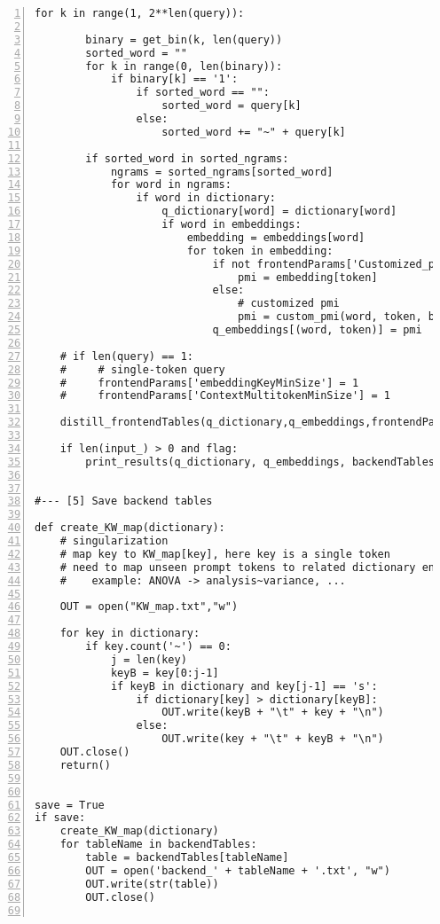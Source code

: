 \documentclass[10pt]{article}
\begin{document}
{\begin{lstlisting}[numbers=left,basicstyle=\ttfamily\footnotesize]
    for k in range(1, 2**len(query)): 

        binary = get_bin(k, len(query))
        sorted_word = ""
        for k in range(0, len(binary)):
            if binary[k] == '1':
                if sorted_word == "":
                    sorted_word = query[k]
                else:
                    sorted_word += "~" + query[k]

        if sorted_word in sorted_ngrams:
            ngrams = sorted_ngrams[sorted_word]
            for word in ngrams:
                if word in dictionary:
                    q_dictionary[word] = dictionary[word]
                    if word in embeddings:
                        embedding = embeddings[word]
                        for token in embedding:
                            if not frontendParams['Customized_pmi']: 
                                pmi = embedding[token]
                            else:
                                # customized pmi
                                pmi = custom_pmi(word, token, backendTables)
                            q_embeddings[(word, token)] = pmi

    # if len(query) == 1: 
    #     # single-token query
    #     frontendParams['embeddingKeyMinSize'] = 1
    #     frontendParams['ContextMultitokenMinSize'] = 1

    distill_frontendTables(q_dictionary,q_embeddings,frontendParams) 

    if len(input_) > 0 and flag: 
        print_results(q_dictionary, q_embeddings, backendTables, frontendParams)


#--- [5] Save backend tables

def create_KW_map(dictionary):
    # singularization
    # map key to KW_map[key], here key is a single token
    # need to map unseen prompt tokens to related dictionary entries 
    #    example: ANOVA -> analysis~variance, ...

    OUT = open("KW_map.txt","w")

    for key in dictionary:
        if key.count('~') == 0: 
            j = len(key)
            keyB = key[0:j-1]
            if keyB in dictionary and key[j-1] == 's':
                if dictionary[key] > dictionary[keyB]:
                    OUT.write(keyB + "\t" + key + "\n")
                else:
                    OUT.write(key + "\t" + keyB + "\n")
    OUT.close()
    return()


save = True 
if save:
    create_KW_map(dictionary)  
    for tableName in backendTables:
        table = backendTables[tableName]
        OUT = open('backend_' + tableName + '.txt', "w")
        OUT.write(str(table))
        OUT.close()


\end{lstlisting}}
\end{document}
